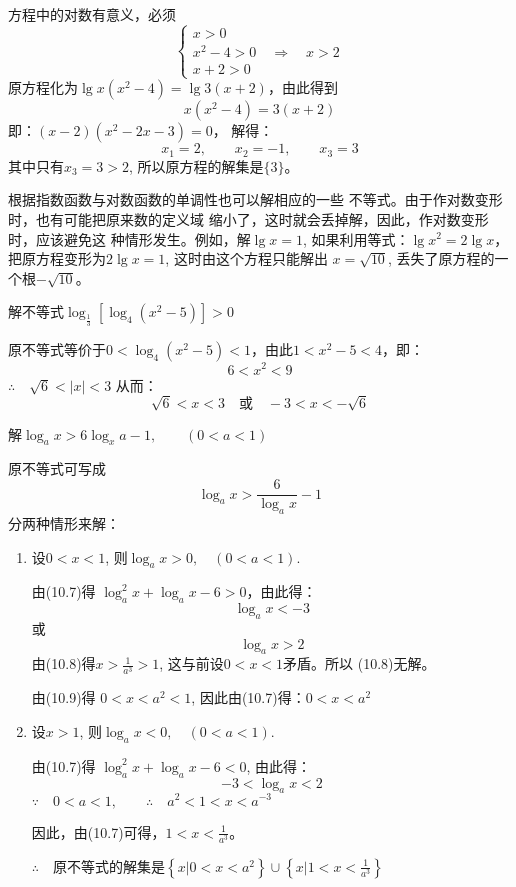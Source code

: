 \begin{solution}
  方程中的对数有意义，必须
    \[\begin{cases}
  x>0\\
  x^2-4>0\quad \Rightarrow\quad  x>2\\
  x+2>0
\end{cases}\]
原方程化为$\lg x(x^2-4)=\lg 3(x+2)$，由此得到
\[x(x^2-4)=3(x+2)\]
即：$(x-2)(x^2-2x-3)=0$，
解得：
\[x_1=2,\qquad x_2=-1,\qquad x_3=3\]
其中只有$x_3=3>2$, 所以原方程的解集是$\{3\}$。
\end{solution}

根据指数函数与对数函数的单调性也可以解相应的一些
不等式。由于作对数变形时，也有可能把原来数的定义域
缩小了，这时就会丢掉解，因此，作对数变形时，应该避免这
种情形发生。例如，解$\lg x=1$, 如果利用等式：$\lg x^2
=2\lg x$，
把原方程变形为$2\lg x=1$, 这时由这个方程只能解出
$x=\sqrt{10}$, 丢失了原方程的一个根$-\sqrt{10}$。

\begin{example}
  解不等式$\log_{\tfrac{1}{3}}[\log_4 (x^2-5)]>0$
\end{example}

\begin{solution}
  原不等式等价于$0<\log_4(x^2-5)<1$，由此$1<x^2-5<4$，即：
\[6<x^2<9\]
$\therefore\quad \sqrt{6}<|x|<3$
从而：
\[\sqrt{6}<x<3\quad \text{或}\quad -3<x<-\sqrt{6}\]
\end{solution}

\begin{example}
  解$\log_a x>6\log_x a-1,\qquad (0<a<1)$
\end{example}

\begin{solution}
  原不等式可写成
\begin{equation}
  \log_a x>\frac{6}{\log_a x}-1
\end{equation}
分两种情形来解：
\begin{enumerate}
  \item 设$0<x<1$, 则$\log_a x>0,\quad (0<a<1)$.
  
由(10.7)得 $\log_a^2 x+\log_a x-6>0$，由此得：
\begin{equation}
  \log_a x<-3
\end{equation}
或
\begin{equation}
  \log_a x>2
\end{equation}
由(10.8)得$x>\frac{1}{a^3}>1$, 这与前设$0<x<1$矛盾。所以
(10.8)无解。

由(10.9)得 $0<x<a^2<1$, 因此由(10.7)得：$0<x<a^2$

\item 设$x>1$, 则$\log_a x<0,\quad (0<a<1)$.

由(10.7)得 $\log_a^2 x+\log_a x-6<0$, 由此得：
\[-3<\log_a x<2\]
$\because\quad 0<a<1,\qquad \therefore\quad a^2<1<x<a^{-3}$

因此，由(10.7)可得，$1<x<\frac{1}{a^3}$。

$\therefore\quad $原不等式的解集是$\left\{x|0<x<a^2\right\}\cup\left\{x\Big|1<x<\frac{1}{a^3}\right\}$
\end{enumerate}
\end{solution}

